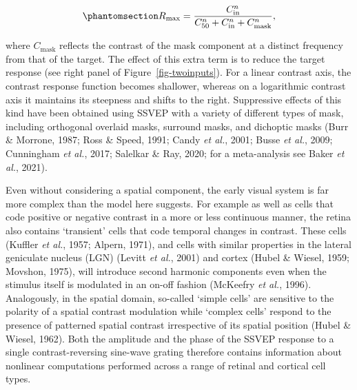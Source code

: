 \documentclass[
  letterpaper,
  DIV=11,
  numbers=noendperiod]{scrartcl}
\begin{document}
\begin{equation}\phantomsection\label{eq-gaincontrol}{R_{\mathrm{max}} = \frac{C_{\mathrm{in}}^n}{C_{50}^n + C_{\mathrm{in}}^n + C_{\mathrm{mask}}^n},}\end{equation}

where \(C_\mathrm{mask}\) reflects the contrast of the mask component at
a distinct frequency from that of the target. The effect of this extra
term is to reduce the target response (see right panel of
Figure~\ref{fig-twoinputs}). For a linear contrast axis, the contrast
response function becomes shallower, whereas on a logarithmic contrast
axis it maintains its steepness and shifts to the right. Suppressive
effects of this kind have been obtained using SSVEP with a variety of
different types of mask, including orthogonal overlaid masks, surround
masks, and dichoptic masks (Burr \& Morrone, 1987; Ross \& Speed, 1991;
Candy \emph{et al.}, 2001; Busse \emph{et al.}, 2009; Cunningham
\emph{et al.}, 2017; Salelkar \& Ray, 2020; for a meta-analysis see
Baker \emph{et al.}, 2021).

Even without considering a spatial component, the early visual system is
far more complex than the model here suggests. For example as well as
cells that code positive or negative contrast in a more or less
continuous manner, the retina also contains `transient' cells that code
temporal changes in contrast. These cells (Kuffler \emph{et al.}, 1957;
Alpern, 1971), and cells with similar properties in the lateral
geniculate nucleus (LGN) (Levitt \emph{et al.}, 2001) and cortex (Hubel
\& Wiesel, 1959; Movshon, 1975), will introduce second harmonic
components even when the stimulus itself is modulated in an on-off
fashion (McKeefry \emph{et al.}, 1996). Analogously, in the spatial
domain, so-called `simple cells' are sensitive to the polarity of a
spatial contrast modulation while `complex cells' respond to the
presence of patterned spatial contrast irrespective of its spatial
position (Hubel \& Wiesel, 1962). Both the amplitude and the phase of
the SSVEP response to a single contrast-reversing sine-wave grating
therefore contains information about nonlinear computations performed
across a range of retinal and cortical cell types.
\end{document}
